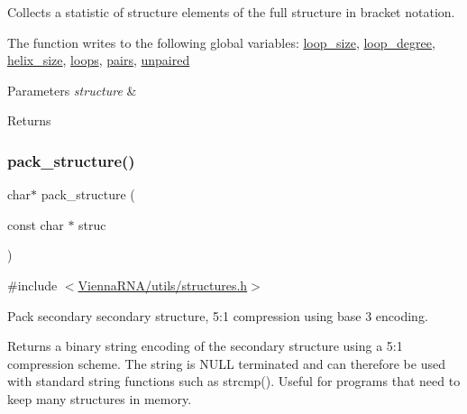 Collects a statistic of structure elements of the full structure in bracket notation. 

The function writes to the following global variables\+: \hyperlink{group__struct__utils__deprecated_ga365a3fad38b21ca8606cb556f2896218}{loop\+\_\+size}, \hyperlink{group__struct__utils__deprecated_ga0518a287aa4a870508cea819029778ab}{loop\+\_\+degree}, \hyperlink{group__struct__utils__deprecated_ga3fce53616c021cbc724fc80b8c1ebeb5}{helix\+\_\+size}, \hyperlink{group__struct__utils__deprecated_ga439fcb9f8d4f9f4d2227fde5fbfecb30}{loops}, \hyperlink{group__struct__utils__deprecated_ga6341cbb704924824e0236c1dce791032}{pairs}, \hyperlink{group__struct__utils__deprecated_gadd2f952597e02d66e1116a9d11d252d6}{unpaired}


\begin{DoxyParams}{Parameters}
{\em structure} & \\
\hline
\end{DoxyParams}
\begin{DoxyReturn}{Returns}

\end{DoxyReturn}
\mbox{\label{group__struct__utils__deprecated_gac6dfa5e22928c087c6e09ff0054a7ced}} 
\subsubsection{\texorpdfstring{pack\+\_\+structure()}{pack\_structure()}}
{\footnotesize\ttfamily char$\ast$ pack\+\_\+structure (\begin{DoxyParamCaption}\item[{const char $\ast$}]{struc }\end{DoxyParamCaption})}



{\ttfamily \#include $<$\hyperlink{utils_2structures_8h}{Vienna\+R\+N\+A/utils/structures.\+h}$>$}



Pack secondary secondary structure, 5\+:1 compression using base 3 encoding. 

Returns a binary string encoding of the secondary structure using a 5\+:1 compression scheme. The string is N\+U\+LL terminated and can therefore be used with standard string functions such as strcmp(). Useful for programs that need to keep many structures in memory.

